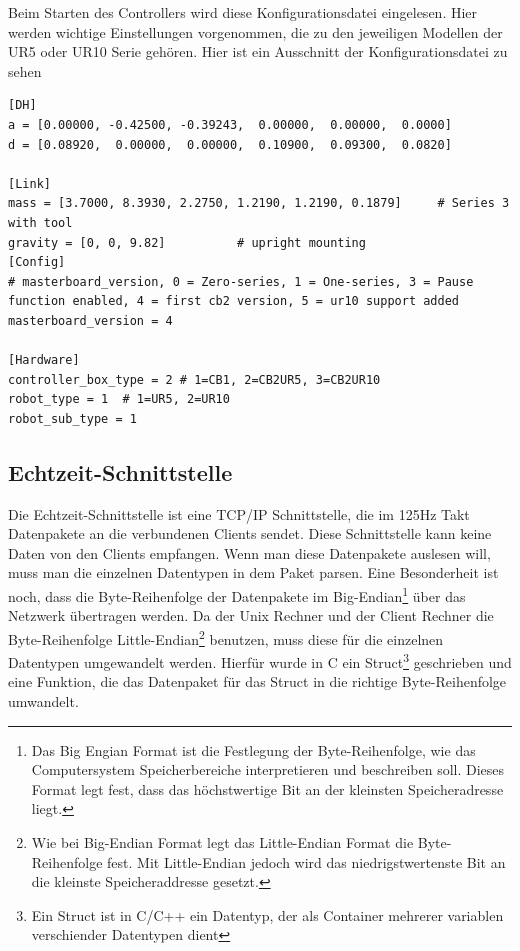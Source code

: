 Beim Starten des Controllers wird diese Konfigurationsdatei eingelesen.
Hier werden wichtige Einstellungen vorgenommen, die zu den jeweiligen Modellen der UR5 oder UR10 Serie gehören. Hier ist ein Ausschnitt der Konfigurationsdatei zu sehen
\\
\begin{lstlisting}[caption={Ausschnitt aus der Datei urcontrol.conf zur Vorkonfigurierung des UR5 Roboters}, label=lst:ur5_conf ,captionpos=b]
[DH]
a = [0.00000, -0.42500, -0.39243,  0.00000,  0.00000,  0.0000]
d = [0.08920,  0.00000,  0.00000,  0.10900,  0.09300,  0.0820]

[Link]
mass = [3.7000, 8.3930, 2.2750, 1.2190, 1.2190, 0.1879]     # Series 3 with tool
gravity = [0, 0, 9.82]          # upright mounting
[Config]
# masterboard_version, 0 = Zero-series, 1 = One-series, 3 = Pause function enabled, 4 = first cb2 version, 5 = ur10 support added
masterboard_version = 4

[Hardware]
controller_box_type = 2 # 1=CB1, 2=CB2UR5, 3=CB2UR10
robot_type = 1  # 1=UR5, 2=UR10
robot_sub_type = 1
\end{lstlisting}

\subsection{Echtzeit-Schnittstelle}
\label{urcontrol_rci_gru}

Die Echtzeit-Schnittstelle ist eine \acs{TCP/IP} Schnittstelle, die im 125Hz Takt Datenpakete an die verbundenen Clients sendet. Diese Schnittstelle kann keine Daten von den Clients empfangen. Wenn man diese Datenpakete auslesen will, muss man die einzelnen Datentypen in dem Paket \acs{parsen}. Eine Besonderheit ist noch, dass die Byte-Reihenfolge der Datenpakete im Big-Endian\footnote{Das Big Engian Format ist die Festlegung der Byte-Reihenfolge, wie das Computersystem Speicherbereiche interpretieren und beschreiben soll. Dieses Format legt fest, dass das höchstwertige Bit an der kleinsten Speicheradresse liegt.} über das Netzwerk übertragen werden. Da der Unix Rechner und der Client Rechner die Byte-Reihenfolge Little-Endian\footnote{Wie bei Big-Endian Format legt das Little-Endian Format die Byte-Reihenfolge fest. Mit Little-Endian jedoch wird das niedrigstwertenste Bit an die kleinste Speicheraddresse gesetzt.} benutzen, muss diese für die einzelnen Datentypen umgewandelt werden. Hierfür wurde in C ein Struct\footnote{Ein Struct ist in C/C++ ein Datentyp, der als Container mehrerer variablen verschiender Datentypen dient} geschrieben und eine Funktion, die das Datenpaket für das Struct in die richtige Byte-Reihenfolge umwandelt.

